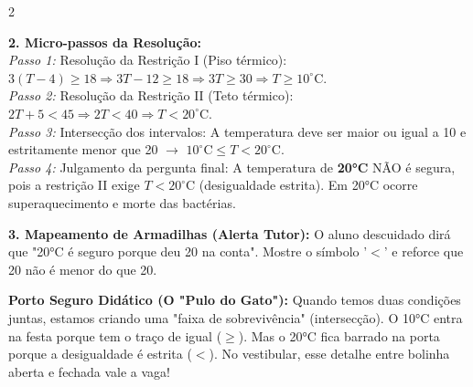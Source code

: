 \begin{multicols*}{2}
\begin{tcolorbox}[colback=CorTitUm!5, colframe=CorTitUm, boxrule=1pt, arc=4pt, left=6pt, right=6pt, top=6pt, bottom=6pt]
    \textbf{2. Micro-passos da Resolução:}\\
    \textit{Passo 1:} Resolução da Restrição I (Piso térmico):\\
    $3(T - 4) \ge 18 \Rightarrow 3T - 12 \ge 18 \Rightarrow 3T \ge 30 \Rightarrow T \ge 10^\circ\text{C}$.\\
    \textit{Passo 2:} Resolução da Restrição II (Teto térmico):\\
    $2T + 5 < 45 \Rightarrow 2T < 40 \Rightarrow T < 20^\circ\text{C}$.\\
    \textit{Passo 3:} Intersecção dos intervalos: A temperatura deve ser maior ou igual a 10 e estritamente menor que 20 $\rightarrow$ $10^\circ\text{C} \le T < 20^\circ\text{C}$.\\
    \textit{Passo 4:} Julgamento da pergunta final: A temperatura de \textbf{20°C} NÃO é segura, pois a restrição II exige $T < 20^\circ\text{C}$ (desigualdade estrita). Em 20°C ocorre superaquecimento e morte das bactérias.\par\vspace{0.1cm}
    
    \textbf{3. Mapeamento de Armadilhas (Alerta Tutor):} O aluno descuidado dirá que "20°C é seguro porque deu 20 na conta". Mostre o símbolo '$<$' e reforce que 20 não é menor do que 20.
    \end{tcolorbox}
    \vspace{0.15cm}
    
    \begin{boxexplicacao}
    \textbf{Porto Seguro Didático (O "Pulo do Gato"):} Quando temos duas condições juntas, estamos criando uma "faixa de sobrevivência" (intersecção). O 10°C entra na festa porque tem o traço de igual ($\ge$). Mas o 20°C fica barrado na porta porque a desigualdade é estrita ($<$). No vestibular, esse detalhe entre bolinha aberta e fechada vale a vaga!
    \end{boxexplicacao}
\fi

\par\vspace{\espacoQuestao}

\end{multicols*}

